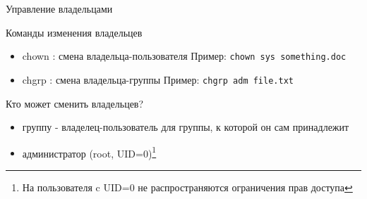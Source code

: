 \begin{frame}[fragile]{Управление владельцами}

  Команды изменения владельцев
  \begin{itemize} 
    \item \alert{chown} : смена владельца-пользователя \newline
      Пример: \verb+chown sys something.doc+
    \item \alert{chgrp} : смена владельца-группы \newline
      Пример: \verb+chgrp adm file.txt+
  \end{itemize} \pause

  Кто может сменить владельцев?
  \begin{itemize}
    \item группу - владелец-пользователь для группы, к которой он сам принадлежит
    \item администратор (root, UID=0)\footnote{На пользователя c UID=0 не распространяются ограничения прав доступа} 
  \end{itemize} 
\end{frame}
